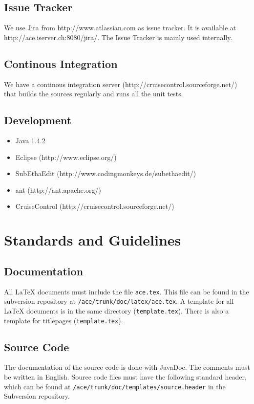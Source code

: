 \documentclass[11pt,a4paper]{article}
\begin{document}
\subsection{Issue Tracker}
We use Jira from http://www.atlassian.com as issue tracker. It is available
at http://ace.iserver.ch:8080/jira/. The Issue Tracker is mainly used internally.

\subsection{Continous Integration}
We have a continous integration server (http://cruisecontrol.sourceforge.net/) that builds the
sources regularly and runs all the unit tests.

\subsection{Development}
\begin{itemize}
 \item Java 1.4.2
 \item Eclipse (http://www.eclipse.org/)
 \item SubEthaEdit (http://www.codingmonkeys.de/subethaedit/)
 \item ant (http://ant.apache.org/)
 \item CruiseControl (http://cruisecontrol.sourceforge.net/)
\end{itemize}


\section{Standards and Guidelines}

\subsection{Documentation}
All \LaTeX{} documents must include the file \texttt{ace.tex}. This file can be found in the subversion repository at \texttt{/ace/trunk/doc/latex/ace.tex}.
A template for all \LaTeX{} documents is in the same directory (\texttt{template.tex}). There is also a template for titlepages (\texttt{template.tex}).

\subsection{Source Code}
The documentation of the source code is done with JavaDoc. The comments must be written in English. Source code files must have the following standard header,
which can be found at \texttt{/ace/trunk/doc/templates/source.header} in the Subversion repository.
\end{document}
